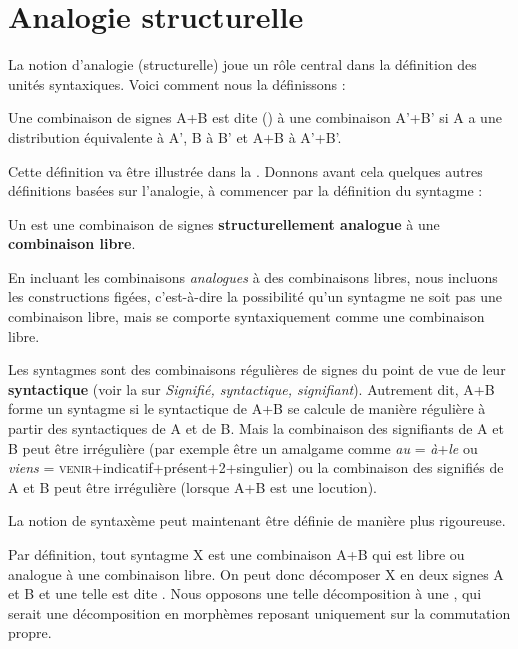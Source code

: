 \section{Analogie structurelle}\label{sec:3.1.2}

La notion d’analogie (structurelle) joue un rôle central dans la définition des unités syntaxiques. Voici comment nous la définissons :

{Une combinaison de signes A+B est dite ()  à une combinaison A’+B’ si A a une distribution équivalente à A’, B à B’ et A+B à A’+B’.}

Cette définition va être illustrée dans la . Donnons avant cela quelques autres définitions basées sur l’analogie, à commencer par la définition du syntagme :

{Un  est une combinaison de signes \textbf{structurellement analogue} à une \textbf{combinaison libre}.}

En incluant les combinaisons \textit{analogues} à des combinaisons libres, nous incluons les constructions figées, c’est-à-dire la possibilité qu’un syntagme ne soit pas une combinaison libre, mais se comporte syntaxiquement comme une combinaison libre.

Les syntagmes sont des combinaisons régulières de signes du point de vue de leur \textbf{syntactique} (voir la  sur \textit{Signifié, syntactique, signifiant}). Autrement dit, A+B forme un syntagme si le syntactique de A+B se calcule de manière régulière à partir des syntactiques de A et de B. Mais la combinaison des signifiants de A et B peut être irrégulière (par exemple être un amalgame comme \textit{au} = \textit{à}+\textit{le} ou \textit{viens} = \textsc{venir}+indicatif+présent+2+singulier) ou la combinaison des signifiés de A et B peut être irrégulière (lorsque A+B est une locution).

La notion de syntaxème peut maintenant être définie de manière plus rigoureuse.

Par définition, tout syntagme X est une combinaison A+B qui est libre ou analogue à une combinaison libre. On peut donc décomposer X en deux signes A et B et une telle  est dite . Nous opposons une telle décomposition à une , qui serait une décomposition en morphèmes reposant uniquement sur la commutation propre.

